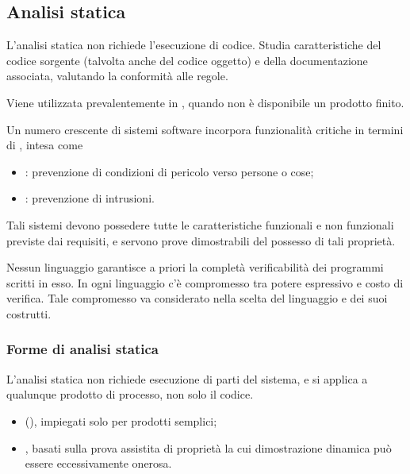 \subsection{Analisi statica}
\label{sub:analisi_statica}

L'analisi statica non richiede l'esecuzione di codice. Studia caratteristiche
del codice sorgente (talvolta anche del codice oggetto) e della documentazione
associata, valutando la conformità alle regole.

Viene utilizzata prevalentemente in , quando non è disponibile
un prodotto finito.

Un numero crescente di sistemi software incorpora funzionalità critiche in
termini di , intesa come

\begin{itemize}
  \item {}: prevenzione di condizioni di pericolo verso
  persone o cose;
  \item {}: prevenzione di intrusioni.
\end{itemize}

Tali sistemi devono possedere tutte le caratteristiche funzionali e non
funzionali previste dai requisiti, e servono prove dimostrabili del possesso di
tali proprietà.

Nessun linguaggio garantisce a priori la completà verificabilità dei programmi
scritti in esso. In ogni linguaggio c'è compromesso tra potere espressivo e
costo di verifica. Tale compromesso va considerato nella scelta del linguaggio
e dei suoi costrutti.

\subsubsection{Forme di analisi statica}
\label{ssub:forme_di_analisi_statica}

L'analisi statica non richiede esecuzione di parti del sistema, e si applica a
qualunque prodotto di processo, non solo il codice.

\begin{itemize}
  \item {} (), impiegati solo per
    prodotti semplici;
  \item {}, basati sulla prova assistita di proprietà la cui
    dimostrazione dinamica può essere eccessivamente onerosa.
\end{itemize}

